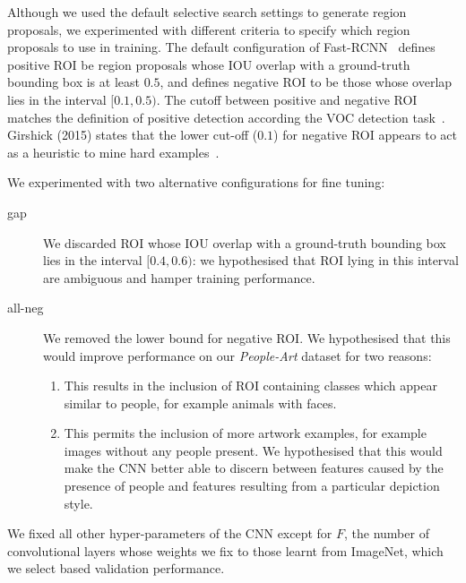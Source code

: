 \documentclass[runningheads]{llncs}
\begin{document}
Although we used the default selective search settings to generate region proposals, we experimented with different criteria to specify which region proposals to use in training.
The default configuration of Fast-RCNN~\cite{girshick2015fast} defines positive \ac{ROI} be region proposals whose \ac{IOU} overlap with a ground-truth bounding box is at least
\begin{math}
  0.5
\end{math},
 and defines negative \ac{ROI} to be those whose overlap lies in the interval 
\begin{math}
  {[{0.1},{0.5})}
\end{math}.
The cutoff between positive and negative \ac{ROI} matches the definition of positive detection according the \ac{VOC} detection task~\cite{everingham2007pascal}.
Girshick (2015) states that the lower cut-off 
(\begin{math}
0.1
\end{math})
for negative \ac{ROI} appears to act as a heuristic to mine hard examples~\cite{girshick2015fast,felzenszwalb2010object}.

We experimented with two alternative configurations for fine tuning:
\begin{description}
  \item[gap] We discarded \ac{ROI} whose \ac{IOU} overlap with a ground-truth bounding box lies in the interval
    \begin{math}
      {[ {0.4},{0.6})}
    \end{math}: 
    we hypothesised that \ac{ROI} lying in this interval are ambiguous and hamper training performance. 
  \item[all-neg] We removed the lower bound for negative \ac{ROI}.
    We hypothesised that this would improve performance on our \textit{People-Art} dataset for two reasons:
    \begin{enumerate}
      \item This results in the inclusion of \ac{ROI} containing classes which appear similar to people, for example animals with faces.
      \item This permits the inclusion of more artwork examples, for example images without any people present.
            We hypothesised that this would make the \ac{CNN} better able to discern between features caused by the presence of people and features resulting from a particular depiction style.
    \end{enumerate}
\end{description}
We fixed all other hyper-parameters of the \ac{CNN} except for
\begin{math}
  F
\end{math},
the number of convolutional layers whose weights we fix to those learnt from ImageNet, which we select based validation performance.
\end{document}
